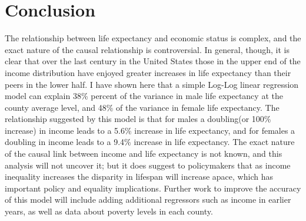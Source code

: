 \documentclass[12pt]{article}
\begin{document}
\section*{Conclusion}
The relationship between life expectancy and economic status is complex, and the exact nature of the causal relationship is controversial. In general, though, it is clear that over the last century in the United States those in the upper end of the income distribution have enjoyed greater increases in life expectancy than their peers in the lower half. I have shown here that a simple Log-Log linear regression model can explain 38\% percent of the variance in male life expectancy at the county average level, and 48\% of the variance in female life expectancy. The relationship suggested by this model is that for males a doubling(or 100\% increase) in income leads to a 5.6\% increase in life expectancy, and for females a doubling in income leads to a 9.4\% increase in life expectancy. The exact nature of the causal link between income and life expectancy is not known, and this analysis will not uncover it; but it does suggest to policymakers that as income inequality increases the disparity in lifespan will increase apace, which has important policy and equality implications. Further work to improve the accuracy of this model will include adding additional regressors such as income in earlier years, as well as data about poverty levels in each county.


\clearpage


\end{document}
